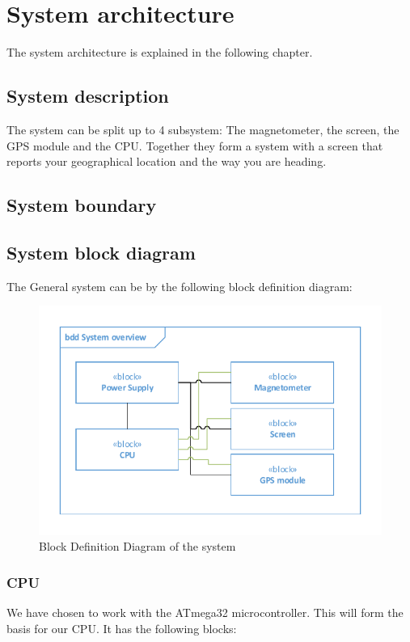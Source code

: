 \chapter{System architecture}
The system architecture is explained in the following chapter.

\section{System description}
The system can be split up to 4 subsystem: The magnetometer, the screen, the GPS module and the CPU. Together they form a system with a screen that reports your geographical location and the way you are heading. 

\section{System boundary}


\section{System block diagram}
The General system can be by the following block definition diagram:\\
\begin{figure}[H]
	\centering
	\includegraphics[width=.8\textwidth]{billeder/SystemBDD}
	\caption{Block Definition Diagram of the system}
	\label{bdd:system}
\end{figure}

\subsection{CPU}
We have chosen to work with the ATmega32 microcontroller. This will form the basis for our CPU. It has the following blocks:\\

